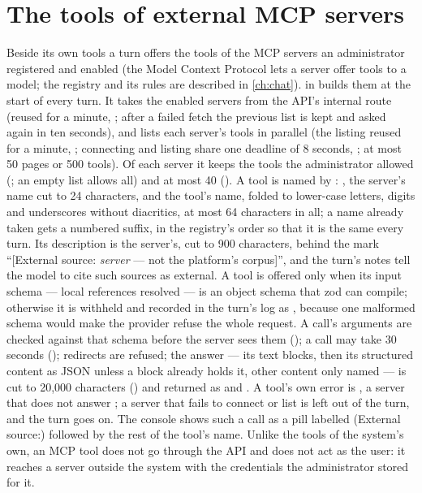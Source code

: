 \section{The tools of external MCP servers}\label{sec:tools:mcp}

Beside its own tools a turn offers the tools of the MCP servers an administrator registered
and enabled (the Model Context Protocol lets a server offer tools to a model; the registry and
its rules are described in \cref{ch:chat}).  in  builds
them at the start of every turn. It takes the enabled servers from the API's internal route
 (reused for a minute, ;
after a failed fetch the previous list is kept and asked again in ten seconds), and lists each
server's tools in parallel (the listing reused for a minute, ; connecting
and listing share one deadline of 8 seconds, ; at most 50 pages or
500 tools). Of each server it keeps the tools the administrator allowed (;
an empty list allows all) and at most 40 (). A tool is named  by
: , the server's name cut to 24 characters, \code{_} and the tool's
name, folded to lower-case letters, digits and underscores without diacritics, at most 64
characters in all; a name already taken gets a numbered suffix, in the registry's order so that
it is the same every turn. Its description is the server's, cut to 900 characters, behind the
mark \enquote{[External source: \emph{server} --- not the platform's corpus]}, and the turn's
notes tell the model to cite such sources as external. A tool is offered only when its input
schema --- local references resolved --- is an object schema that zod can compile; otherwise
it is withheld and recorded in the turn's log as , because one
malformed schema would make the provider refuse the whole request. A call's arguments are
checked against that schema before the server sees them (); a call may
take 30 seconds (); redirects are refused; the answer --- its text blocks,
then its structured content as JSON unless a block already holds it, other content only named
--- is cut to 20,000 characters () and returned as  and
. A tool's own error is , a server that does not answer
; a server that fails to connect or list is left out of the turn, and the
turn goes on. The console shows such a call as a pill labelled  (External source:)
followed by the rest of the tool's name. Unlike the tools of the system's own, an MCP tool does not go through the API
and does not act as the user: it reaches a server outside the system with the credentials the
administrator stored for it.
